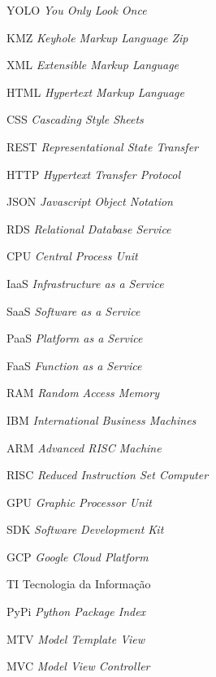 \begin{siglas}
	\item[YOLO] \textit{You Only Look Once}
	\item[KMZ] \textit{Keyhole Markup Language Zip} 
	\item[XML]  \textit{Extensible Markup Language} 
	\item[HTML] \textit{Hypertext Markup Language} 
	\item[CSS] \textit{Cascading Style Sheets}
	\item[REST] \textit{Representational State Transfer}
	\item[HTTP] \textit{Hypertext Transfer Protocol}
	\item[JSON]  \textit{Javascript Object Notation}     
	\item[RDS] \textit{Relational Database Service}  
	\item[CPU] \textit{Central Process Unit} 
	\item[IaaS] \textit{Infrastructure as a Service}
	\item[SaaS] \textit{Software as a Service}
	\item[PaaS] \textit{Platform as a Service}
	\item[FaaS] \textit{Function as a Service}
	\item[RAM] \textit{Random Access Memory}
	\item[IBM] \textit{International Business Machines}
	\item[ARM] \textit{Advanced RISC Machine}
	\item[RISC]\textit{Reduced Instruction Set Computer}
	\item[GPU] \textit{Graphic Processor Unit}
	\item[SDK] \textit{Software Development Kit}
	\item[GCP] \textit{Google Cloud Platform}
	\item[TI]  Tecnologia da Informação
	\item[PyPi] \textit{Python Package Index}
	\item[MTV]	\textit{Model Template View}
	\item[MVC]   \textit{Model View Controller}
\end{siglas}
